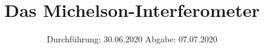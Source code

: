 

\subject{Versuch Nr. 401}
\title{Das Michelson-Interferometer}
\date{%
  Durchführung: 30.06.2020
  \hspace{3em}
  Abgabe: 07.07.2020
}


\setlength{\parindent}{0pt} %

\maketitle
\thispagestyle{empty}
\tableofcontents
\newpage








\printbibliography{}


